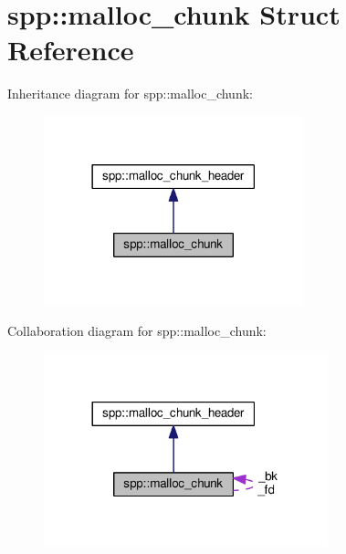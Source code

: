 \hypertarget{structspp_1_1malloc__chunk}{}\section{spp\+:\+:malloc\+\_\+chunk Struct Reference}
\label{structspp_1_1malloc__chunk}


Inheritance diagram for spp\+:\+:malloc\+\_\+chunk\+:\nopagebreak
\begin{figure}[H]
\begin{center}
\leavevmode
\includegraphics[width=213pt]{structspp_1_1malloc__chunk__inherit__graph}
\end{center}
\end{figure}


Collaboration diagram for spp\+:\+:malloc\+\_\+chunk\+:\nopagebreak
\begin{figure}[H]
\begin{center}
\leavevmode
\includegraphics[width=233pt]{structspp_1_1malloc__chunk__coll__graph}
\end{center}
\end{figure}
